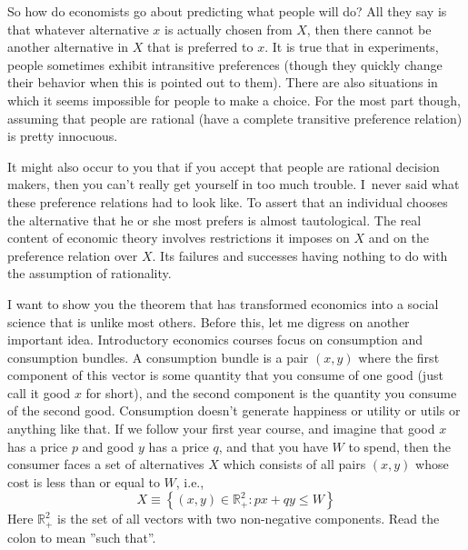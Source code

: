 \documentclass[12pt]{article}
\begin{document}
So how do economists go about predicting what people will do? All they say is
that whatever alternative $x$ is actually chosen from $X$, then there cannot be
another alternative in $X$ that is preferred to $x$. It is true that in
experiments, people sometimes exhibit intransitive preferences (though they
quickly change their behavior when this is pointed out to them). There are
also situations in which it seems impossible for people to make a choice. For
the most part though, assuming that people are rational (have a complete
transitive preference relation) is pretty innocuous.

It might also occur to you that if you accept that people are rational
decision makers, then you can't really get yourself in too much trouble.
I\ never said what these preference relations had to look like. To assert that
an individual chooses the alternative that he or she most prefers is almost
tautological. The real content of economic theory involves restrictions it
imposes on $X$ and on the preference relation over $X$. Its failures and
successes having nothing to do with the assumption of rationality.

I want to show you the theorem that has transformed economics into a social
science that is unlike most others. Before this, let me digress on another
important idea. Introductory economics courses focus on consumption and
consumption bundles. A consumption bundle is a pair $\left(  x,y\right)  $
where the first component of this vector is some quantity that you consume of
one good (just call it good $x$ for short), and the second component is the
quantity you consume of the second good. Consumption doesn't generate
happiness or utility or utils or anything like that. If we follow your first
year course, and imagine that good $x$ has a price $p$ and good $y$ has a
price $q$, and that you have $W$ to spend, then the consumer faces a
set of alternatives $X$ which consists of all pairs $\left(  x,y\right)  $
whose cost is less than or equal to $W$, i.e.,%
\[
X\equiv\left\{  \left(  x,y\right)  \in\mathbb{R}_{+}^{2}:px+qy\leq
W\right\}
\]
Here $\mathbb{R}_{+}^{2}$ is the set of all vectors with two non-negative
components. Read the colon to mean ''such that''.
\end{document}
